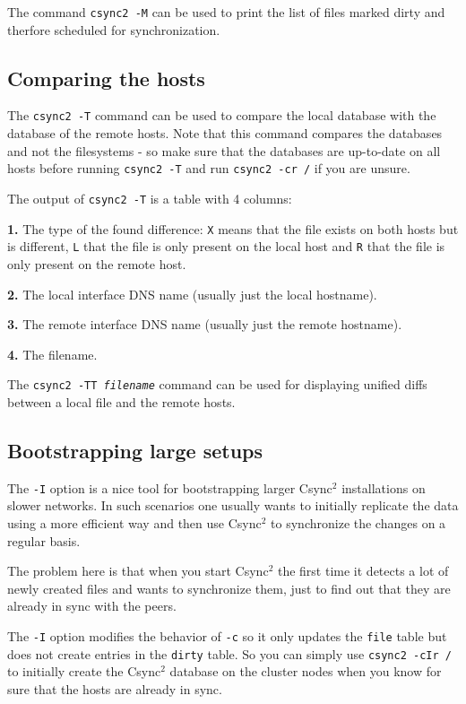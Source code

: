 \documentclass[a4paper,twocolumn]{article}
\def\csync2{{\sc Csync$^{2}$}}
\begin{document}
The command {\tt csync2 -M} can be used to print the list of files marked dirty
and therfore scheduled for synchronization.

\subsection{Comparing the hosts}

The {\tt csync2 -T} command can be used to compare the local database with the
database of the remote hosts. Note that this command compares the databases and
not the filesystems - so make sure that the databases are up-to-date on all
hosts before running {\tt csync2 -T} and run {\tt csync2 -cr /} if you are
unsure.

The output of {\tt csync2 -T} is a table with 4 columns:

{\bf 1.} The type of the found difference: {\tt X} means that the file exists
on both hosts but is different, {\tt L} that the file is only present on the
local host and {\tt R} that the file is only present on the remote host.

{\bf 2.} The local interface DNS name (usually just the local hostname).

{\bf 3.} The remote interface DNS name (usually just the remote hostname).

{\bf 4.} The filename.

The {\tt csync2 -TT {\it filename}} command can be used for displaying unified
diffs between a local file and the remote hosts.

\subsection{Bootstrapping large setups}

The {\tt -I} option is a nice tool for bootstrapping larger \csync2
installations on slower networks. In such scenarios one usually wants to
initially replicate the data using a more efficient way and then use \csync2 to
synchronize the changes on a regular basis.

The problem here is that when you start \csync2 the first time it detects a lot
of newly created files and wants to synchronize them, just to find out that
they are already in sync with the peers.

The {\tt -I} option modifies the behavior of {\tt -c} so it only updates the
{\tt file} table but does not create entries in the {\tt dirty} table. So you
can simply use {\tt csync2 -cIr /} to initially create the \csync2 database on
the cluster nodes when you know for sure that the hosts are already in sync.
\end{document}
